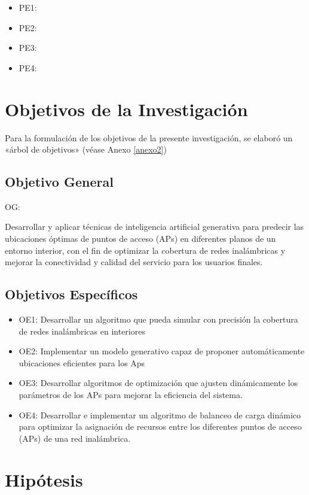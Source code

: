 \begin{itemize}
	\item PE1: {\Pbone}
	\item PE2: {\Pbtwo}
	\item PE3: {\Pbthree}
	\item PE4: {\Pbfour}
\end{itemize}

\section{Objetivos de la Investigación}
Para la formulación de los objetivos de la presente investigación, se elaboró un «árbol de objetivos» (véase Anexo \ref{anexo2}) 
\subsection{Objetivo General}
OG: \newcommand{\ObjetivoGeneral}{
Desarrollar y aplicar técnicas de inteligencia artificial generativa para predecir las ubicaciones óptimas de puntos de acceso (APs) en diferentes planos de un entorno interior, con el fin de optimizar la cobertura de redes inalámbricas y mejorar la conectividad y calidad del servicio para los usuarios finales.
}
\ObjetivoGeneral
\subsection{Objetivos Específicos}
\newcommand{\Objone}{
Desarrollar un algoritmo que pueda simular con precisión la cobertura de redes inalámbricas en interiores
}
\newcommand{\Objtwo}{
Implementar un modelo generativo capaz de proponer automáticamente ubicaciones eficientes para los Aps
}
\newcommand{\Objthree}{
Desarrollar algoritmos de optimización que ajusten dinámicamente los parámetros de los APs para mejorar la eficiencia del sistema.
}
\newcommand{\Objfour}{
Desarrollar e implementar un algoritmo de balanceo de carga dinámico para optimizar la asignación de recursos entre los diferentes puntos de acceso (APs) de una red inalámbrica.
}

\begin{itemize}
	\item OE1: {\Objone}
	\item OE2: {\Objtwo}
	\item OE3: {\Objthree}
	\item OE4: {\Objfour}
\end{itemize}

\section{Hipótesis}

